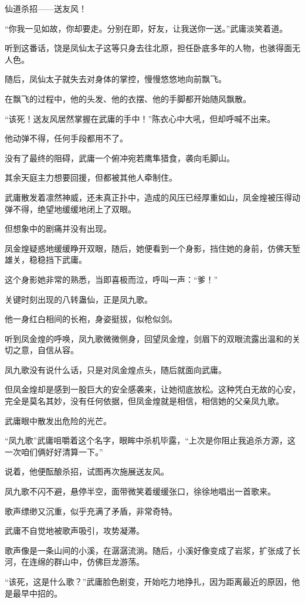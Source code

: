 \begin{this_body}
仙道杀招——送友风！

“你我一见如故，你却要走。分别在即，好友，让我送你一送。”武庸淡笑着道。

听到这番话，饶是凤仙太子这等只身去往北原，担任卧底多年的人物，也骇得面无人色。

随后，凤仙太子就失去对身体的掌控，慢慢悠悠地向前飘飞。

在飘飞的过程中，他的头发、他的衣摆、他的手脚都开始随风飘散。

“该死！送友风居然掌握在武庸的手中！”陈衣心中大吼，但却呼喊不出来。

他动弹不得，任何手段都用不了。

没有了最终的阻碍，武庸一个俯冲宛若鹰隼猎食，袭向毛脚山。

其余天庭主力想要回援，但都被其他人牵制住。

武庸散发着凛然神威，还未真正扑中，造成的风压已经厚重如山，凤金煌被压得动弹不得，绝望地缓缓地闭上了双眼。

但想象中的剧痛并没有出现。

凤金煌疑惑地缓缓睁开双眼，随后，她便看到一个身影，挡住她的身前，仿佛天堑雄关，稳稳挡下武庸。

这个身影她非常的熟悉，当即喜极而泣，呼叫一声：“爹！”

关键时刻出现的八转蛊仙，正是凤九歌。

他一身红白相间的长袍，身姿挺拔，似枪似剑。

听到凤金煌的呼唤，凤九歌微微侧身，回望凤金煌，剑眉下的双眼流露出温和的关切之意，自信从容。

凤九歌没有说什么话，只是对凤金煌点头，随后就面向武庸。

但凤金煌却是感到一股巨大的安全感袭来，让她彻底放松。这种凭白无故的心安，完全是莫名其妙，没有任何依据，但凤金煌就是相信，相信她的父亲凤九歌。

武庸眼中散发出危险的光芒。

“凤九歌”武庸咀嚼着这个名字，眼眸中杀机毕露，“上次是你阻止我追杀方源，这一次咱们俩好好清算一下。”

说着，他便酝酿杀招，试图再次施展送友风。

凤九歌不闪不避，悬停半空，面带微笑着缓缓张口，徐徐地唱出一首歌来。

歌声缥缈又沉重，似乎充满了矛盾，非常奇特。

武庸不自觉地被歌声吸引，攻势凝滞。

歌声像是一条山间的小溪，在潺潺流淌。随后，小溪好像变成了岩浆，扩张成了长河，在连绵的群山中，仿佛巨龙游荡。

“该死，这是什么歌？”武庸脸色剧变，开始吃力地挣扎，因为距离最近的原因，他是最早中招的。


\end{this_body}
